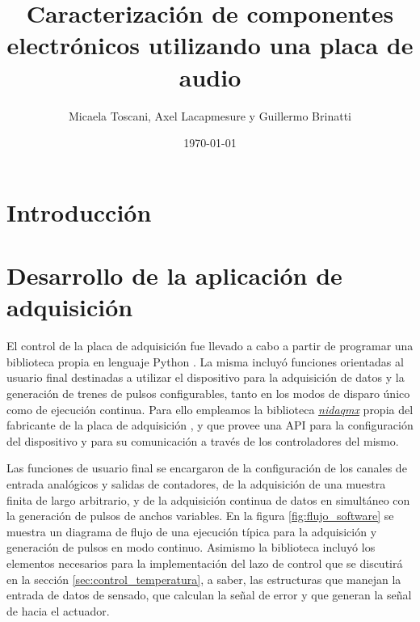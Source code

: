 \documentclass[a4paper,11pt]{article}
\title{Caracterización de componentes electrónicos utilizando una placa de audio}
\date{\today}
\author{Micaela Toscani, Axel Lacapmesure y Guillermo Brinatti}
\begin{document}
\maketitle



\section{Introducción}

\section{Desarrollo de la aplicación de adquisición}
\label{sec:software}

	El control de la placa de adquisición fue llevado a cabo a partir de programar una biblioteca propia en lenguaje Python \cite{repo}. La misma incluyó funciones orientadas al usuario final destinadas a utilizar el dispositivo para la adquisición de datos y la generación de trenes de pulsos configurables, tanto en los modos de disparo único como de ejecución continua. Para ello empleamos la biblioteca \emph{\href{https://nidaqmx-python.readthedocs.io}{nidaqmx}} propia del fabricante de la placa de adquisición \cite{nidaqmx}, y que provee una API para la configuración del dispositivo y para su comunicación a través de los controladores del mismo.
	
	Las funciones de usuario final se encargaron de la configuración de los canales de entrada analógicos y salidas de contadores, de la adquisición de una muestra finita de largo arbitrario, y de la adquisición continua de datos en simultáneo con la generación de pulsos de anchos variables. En la figura \ref{fig:flujo_software} se muestra un diagrama de flujo de una ejecución típica para la adquisición y generación de pulsos en modo continuo. Asimismo la biblioteca incluyó los elementos necesarios para la implementación del lazo de control que se discutirá en la sección \ref{sec:control_temperatura}, a saber, las estructuras que manejan la entrada de datos de sensado, que calculan la señal de error y que generan la señal de hacia el actuador.
	
\end{document}
